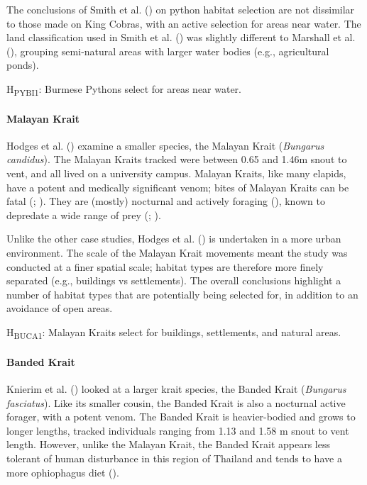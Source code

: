 \documentclass[10pt,a4paper]{article}
\begin{document}
The conclusions of Smith et al. () on python habitat selection are not dissimilar to those made on King Cobras, with an active selection for areas near water.
The land classification used in Smith et al. () was slightly different to Marshall et al. (), grouping semi-natural areas with larger water bodies (e.g., agricultural ponds).

H\textsubscript{PYBI1}: Burmese Pythons select for areas near water.

\paragraph{Malayan Krait}\label{malayan-krait}

Hodges et al. () examine a smaller species, the Malayan Krait (\emph{Bungarus candidus}).
The Malayan Kraits tracked were between 0.65 and 1.46m snout to vent, and all lived on a university campus.
Malayan Kraits, like many elapids, have a potent and medically significant venom; bites of Malayan Kraits can be fatal (; ).
They are (mostly) nocturnal and actively foraging (), known to depredate a wide range of prey (; ).

Unlike the other case studies, Hodges et al. () is undertaken in a more urban environment.
The scale of the Malayan Krait movements meant the study was conducted at a finer spatial scale; habitat types are therefore more finely separated (e.g., buildings vs settlements).
The overall conclusions highlight a number of habitat types that are potentially being selected for, in addition to an avoidance of open areas.

H\textsubscript{BUCA1}: Malayan Kraits select for buildings, settlements, and natural areas.

\paragraph{Banded Krait}\label{banded-krait}

Knierim et al. () looked at a larger krait species, the Banded Krait (\emph{Bungarus fasciatus}).
Like its smaller cousin, the Banded Krait is also a nocturnal active forager, with a potent venom.
The Banded Krait is heavier-bodied and grows to longer lengths, tracked individuals ranging from 1.13 and 1.58 m snout to vent length.
However, unlike the Malayan Krait, the Banded Krait appears less tolerant of human disturbance in this region of Thailand and tends to have a more ophiophagus diet ().
\end{document}

